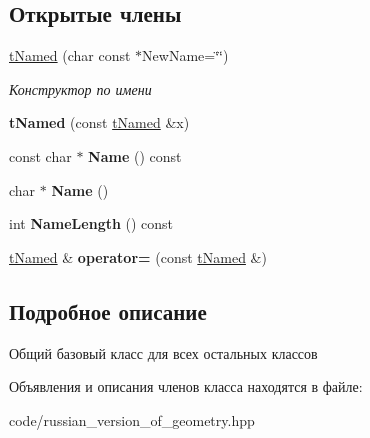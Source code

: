 \subsection*{Открытые члены}
\begin{DoxyCompactItemize}
\item 
\mbox{\label{classtNamed_a05e5161fa4d6de5530a35aebe379f99c}} 
\hyperlink{classtNamed_a05e5161fa4d6de5530a35aebe379f99c}{t\+Named} (char const $\ast$New\+Name=\char`\"{}\char`\"{})
\begin{DoxyCompactList}\small\item\em Конструктор по имени \end{DoxyCompactList}\item 
\mbox{\label{classtNamed_ab5f18adfba945ef9711b442680e7e613}} 
{\bfseries t\+Named} (const \hyperlink{classtNamed}{t\+Named} \&x)
\item 
\mbox{\label{classtNamed_a8e159dc56389dad5e13d08097b1db3de}} 
const char $\ast$ {\bfseries Name} () const
\item 
\mbox{\label{classtNamed_a4ee0439b245fb018e39c3b3dd7e52d47}} 
char $\ast$ {\bfseries Name} ()
\item 
\mbox{\label{classtNamed_a0f9ee5b68f19ab435fcdd263dd31c27f}} 
int {\bfseries Name\+Length} () const
\item 
\mbox{\label{classtNamed_a2cf8d7ca50e915fc1594b6a161f9334b}} 
\hyperlink{classtNamed}{t\+Named} \& {\bfseries operator=} (const \hyperlink{classtNamed}{t\+Named} \&)
\end{DoxyCompactItemize}


\subsection{Подробное описание}
Общий базовый класс для всех остальных классов 

Объявления и описания членов класса находятся в файле\+:\begin{DoxyCompactItemize}
\item 
code/russian\+\_\+version\+\_\+of\+\_\+geometry.\+hpp\end{DoxyCompactItemize}
